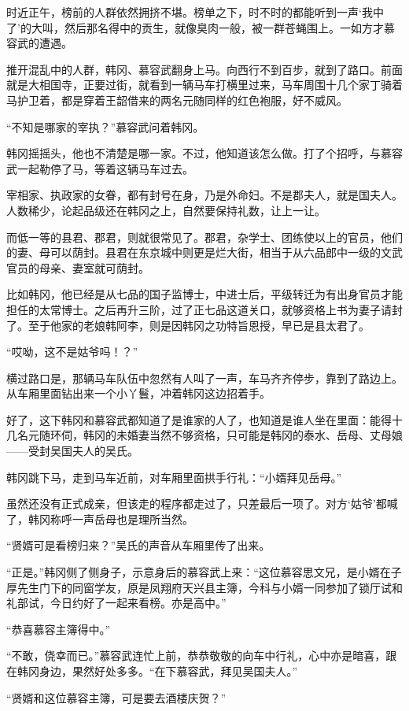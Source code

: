 时近正午，榜前的人群依然拥挤不堪。榜单之下，时不时的都能听到一声‘我中了’的大叫，然后那名得中的贡生，就像臭肉一般，被一群苍蝇围上。一如方才慕容武的遭遇。

推开混乱中的人群，韩冈、慕容武翻身上马。向西行不到百步，就到了路口。前面就是大相国寺，正要过街，就看到一辆马车打横里过来，马车周围十几个家丁骑着马护卫着，都是穿着王韶借来的两名元随同样的红色袍服，好不威风。

“不知是哪家的宰执？”慕容武问着韩冈。

韩冈摇摇头，他也不清楚是哪一家。不过，他知道该怎么做。打了个招呼，与慕容武一起勒停了马，等着这辆马车过去。

宰相家、执政家的女眷，都有封号在身，乃是外命妇。不是郡夫人，就是国夫人。人数稀少，论起品级还在韩冈之上，自然要保持礼数，让上一让。

而低一等的县君、郡君，则就很常见了。郡君，杂学士、团练使以上的官员，他们的妻、母可以荫封。县君在东京城中则更是烂大街，相当于从六品郎中一级的文武官员的母亲、妻室就可荫封。

比如韩冈，他已经是从七品的国子监博士，中进士后，平级转迁为有出身官员才能担任的太常博士。之后再升三阶，过了正七品这道关口，就够资格上书为妻子请封了。至于他家的老娘韩阿李，则是因韩冈之功特旨恩授，早已是县太君了。

“哎呦，这不是姑爷吗！？”

横过路口是，那辆马车队伍中忽然有人叫了一声，车马齐齐停步，靠到了路边上。从车厢里面钻出来一个小丫鬟，冲着韩冈这边招着手。

好了，这下韩冈和慕容武都知道了是谁家的人了，也知道是谁人坐在里面：能得十几名元随环伺，韩冈的未婚妻当然不够资格，只可能是韩冈的泰水、岳母、丈母娘——受封吴国夫人的吴氏。

韩冈跳下马，走到马车近前，对车厢里面拱手行礼：“小婿拜见岳母。”

虽然还没有正式成亲，但该走的程序都走过了，只差最后一项了。对方‘姑爷’都喊了，韩冈称呼一声岳母也是理所当然。

“贤婿可是看榜归来？”吴氏的声音从车厢里传了出来。

“正是。”韩冈侧了侧身子，示意身后的慕容武上来：“这位慕容思文兄，是小婿在子厚先生门下的同窗学友，原是凤翔府天兴县主簿，今科与小婿一同参加了锁厅试和礼部试，今日约好了一起来看榜。亦是高中。”

“恭喜慕容主簿得中。”

“不敢，侥幸而已。”慕容武连忙上前，恭恭敬敬的向车中行礼，心中亦是暗喜，跟在韩冈身边，果然好处多多。“在下慕容武，拜见吴国夫人。”

“贤婿和这位慕容主簿，可是要去酒楼庆贺？”

